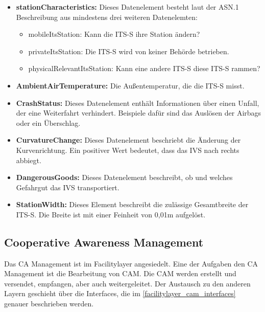 \begin{itemize}
	\item \textbf{stationCharacteristics: } Dieses Datenelement besteht laut der \ac{ASN.1} Beschreibung aus mindestens drei weiteren Datenelemten:
	\begin{itemize}
		\item mobileItsStation: Kann die \ac{ITS-S} ihre Station ändern?
		\item privateItsStation: Die \ac{ITS-S} wird von keiner Behörde betrieben.
		\item physicalRelevantItsStation: Kann eine andere \ac{ITS-S} diese \ac{ITS-S} rammen?
	\end{itemize}
	\item \textbf{AmbientAirTemperature: } Die Außentemperatur, die die \ac{ITS-S} misst.
	\item \textbf{CrashStatus: } Dieses Datenelement enthält Informationen über einen Unfall, der eine Weiterfahrt verhindert. Beispiele dafür sind das Auslösen der Airbags oder ein Überschlag.
	\item \textbf{CurvatureChange: } Dieses Datenelement beschriebt die Änderung der Kurvenrichtung. Ein positiver Wert bedeutet, dass das \ac{IVS} nach rechts abbiegt.
	\item  \textbf{DangerousGoods: } Dieses Datenelement beschreibt, ob und welches Gefahrgut  das \ac{IVS} transportiert.
	\item \textbf{StationWidth: } Dieses Element beschreibt die zulässige Gesamtbreite der \ac{ITS-S}. Die Breite ist mit einer Feinheit von 0,01m aufgelöst.
\end{itemize}

\subsection{Cooperative Awareness Management}
Das \ac{CA} Management ist im Facilitylayer angesiedelt. Eine der Aufgaben den \ac{CA} Management ist die Bearbeitung von \ac{CAM}. Die \ac{CAM} werden erstellt und versendet, empfangen, aber auch weitergeleitet. Der Austausch zu den anderen Layern geschieht über die Interfaces, die im \autoref{facilitylayer_cam_interfaces} genauer beschrieben werden.  

